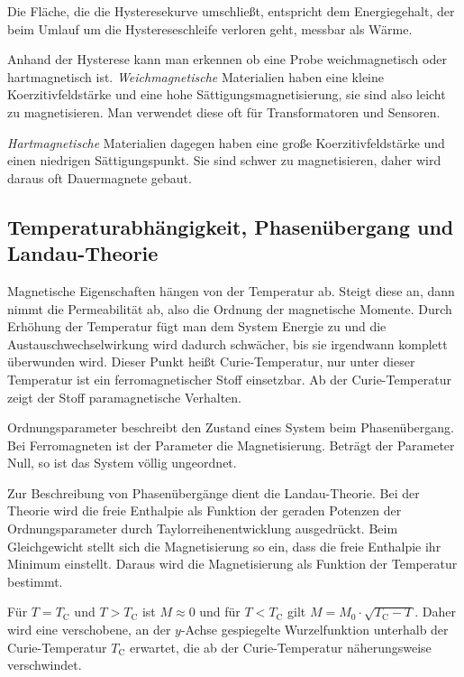 \documentclass[12pt,a4paper]{scrartcl}
\numberwithin{equation}{section} %
\renewcommand{\[}{} %
\renewcommand{\]}{\noindent} %
\begin{document}
Die Fläche, die die Hysteresekurve umschließt, entspricht dem
Energiegehalt, der beim Umlauf um die Hystereseschleife verloren geht,
messbar als Wärme.

Anhand der Hysterese kann man erkennen ob eine Probe weichmagnetisch
oder hartmagnetisch ist. \emph{Weichmagnetische} Materialien haben eine
kleine Koerzitivfeldstärke und eine hohe Sättigungsmagnetisierung, sie
sind also leicht zu magnetisieren. Man verwendet diese oft für
Transformatoren und Sensoren.

\emph{Hartmagnetische} Materialien dagegen haben eine große
Koerzitivfeldstärke und einen niedrigen Sättigungspunkt. Sie sind schwer
zu magnetisieren, daher wird daraus oft Dauermagnete gebaut.

\hypertarget{temperaturabhuxe4ngigkeit-phasenuxfcbergang-und-landau-theorie}{%
\subsection{Temperaturabhängigkeit, Phasenübergang und
Landau-Theorie}\label{temperaturabhuxe4ngigkeit-phasenuxfcbergang-und-landau-theorie}}

Magnetische Eigenschaften hängen von der Temperatur ab. Steigt diese an,
dann nimmt die Permeabilität ab, also die Ordnung der magnetische
Momente. Durch Erhöhung der Temperatur fügt man dem System Energie zu
und die Austauschwechselwirkung wird dadurch schwächer, bis sie
irgendwann komplett überwunden wird. Dieser Punkt heißt
Curie-Temperatur, nur unter dieser Temperatur ist ein ferromagnetischer
Stoff einsetzbar. Ab der Curie-Temperatur zeigt der Stoff
paramagnetische Verhalten.

Ordnungsparameter beschreibt den Zustand eines System beim
Phasenübergang. Bei Ferromagneten ist der Parameter die Magnetisierung.
Beträgt der Parameter Null, so ist das System völlig ungeordnet.

Zur Beschreibung von Phasenübergänge dient die Landau-Theorie. Bei der
Theorie wird die freie Enthalpie als Funktion der geraden Potenzen der
Ordnungsparameter durch Taylorreihenentwicklung ausgedrückt. Beim
Gleichgewicht stellt sich die Magnetisierung so ein, dass die freie
Enthalpie ihr Minimum einstellt. Daraus wird die Magnetisierung als
Funktion der Temperatur bestimmt.

Für \(T=T_\mathrm{C}\) und \(T > T_\mathrm{C}\) ist \(M\approx 0\) und
für \(T < T_\mathrm{C}\) gilt \(M = M_0 \cdot \sqrt{T_\mathrm{C} - T}\).
Daher wird eine verschobene, an der \(y\)-Achse gespiegelte
Wurzelfunktion unterhalb der Curie-Temperatur \(T_\mathrm{C}\) erwartet,
die ab der Curie-Temperatur näherungsweise verschwindet.
\end{document}
